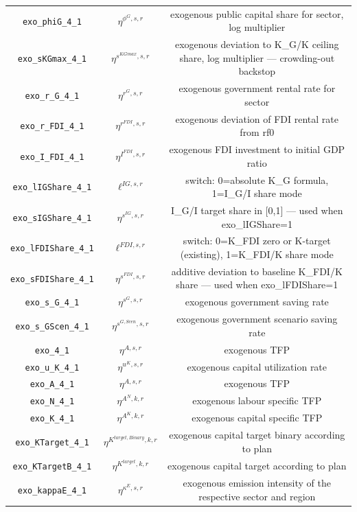 \begin{center}
\begin{longtable}{ccc}
\texttt{exo\_phiG\_4\_1} & ${\eta^{\phi^{G},s,r}}$ & exogenous public capital share for sector, log multiplier\\
\texttt{exo\_sKGmax\_4\_1} & ${\eta^{s^{KGmax},s,r}}$ & exogenous deviation to K\_G/K ceiling share, log multiplier — crowding-out backstop\\
\texttt{exo\_r\_G\_4\_1} & ${\eta^{r^G,s,r}}$ & exogenous government rental rate for sector\\
\texttt{exo\_r\_FDI\_4\_1} & ${\eta^{r^{FDI},s,r}}$ & exogenous deviation of FDI rental rate from rf0\\
\texttt{exo\_I\_FDI\_4\_1} & ${\eta^{I^{FDI},s,r}}$ & exogenous FDI investment to initial GDP ratio\\
\texttt{exo\_lIGShare\_4\_1} & ${\ell^{IG,s,r}}$ & switch: 0=absolute K\_G formula, 1=I\_G/I share mode\\
\texttt{exo\_sIGShare\_4\_1} & ${\eta^{s^{IG},s,r}}$ & I\_G/I target share in [0,1] — used when exo\_lIGShare=1\\
\texttt{exo\_lFDIShare\_4\_1} & ${\ell^{FDI,s,r}}$ & switch: 0=K\_FDI zero or K-target (existing), 1=K\_FDI/K share mode\\
\texttt{exo\_sFDIShare\_4\_1} & ${\eta^{s^{FDI},s,r}}$ & additive deviation to baseline K\_FDI/K share — used when exo\_lFDIShare=1\\
\texttt{exo\_s\_G\_4\_1} & ${\eta^{s^G,s,r}}$ & exogenous government saving rate\\
\texttt{exo\_s\_GScen\_4\_1} & ${\eta^{s^{G,Scen},s,r}}$ & exogenous government scenario saving rate\\
\texttt{exo\_4\_1} & ${\eta^{A,s,r}}$ & exogenous TFP\\
\texttt{exo\_u\_K\_4\_1} & ${\eta^{u^K,s,r}}$ & exogenous capital utilization rate\\
\texttt{exo\_A\_4\_1} & ${\eta^{A,s,r}}$ & exogenous TFP\\
\texttt{exo\_N\_4\_1} & ${\eta^{A^{N},k,r}}$ & exogenous labour specific TFP\\
\texttt{exo\_K\_4\_1} & ${\eta^{A^{K},k,r}}$ & exogenous capital specific TFP\\
\texttt{exo\_KTarget\_4\_1} & ${\eta^{K^{target,Binary},k,r}}$ & exogenous capital target binary according to plan\\
\texttt{exo\_KTargetB\_4\_1} & ${\eta^{K^{target},k,r}}$ & exogenous capital target according to plan\\
\texttt{exo\_kappaE\_4\_1} & ${\eta^{\kappa^{E},s,r}}$ & exogenous emission intensity of the respective sector and region\\

\end{longtable}
\end{center}
